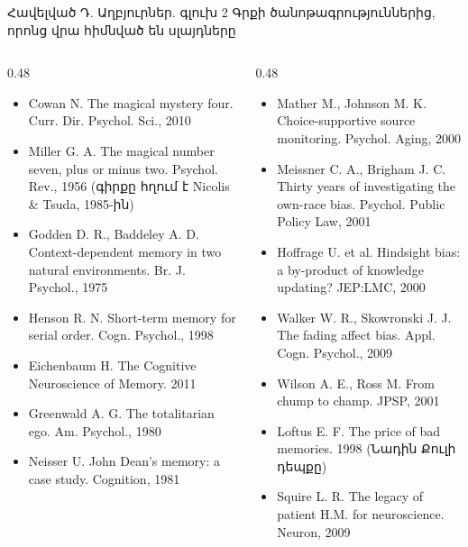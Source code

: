 \begin{frame}{Հավելված Դ. Աղբյուրներ. գլուխ 2}
  \scriptsize
  Գրքի ծանոթագրություններից, որոնց վրա հիմնված են սլայդները\par\smallskip
  \begin{columns}[T]
    \begin{column}{0.48\textwidth}
      \begin{itemize}\setlength{\itemsep}{0.4mm}
        \item Cowan N. The magical mystery four. Curr. Dir. Psychol. Sci., 2010
        \item Miller G. A. The magical number seven, plus or minus two. Psychol. Rev., 1956 (գիրքը հղում է Nicolis \& Tsuda, 1985-ին)
        \item Godden D. R., Baddeley A. D. Context-dependent memory in two natural environments. Br. J. Psychol., 1975
        \item Henson R. N. Short-term memory for serial order. Cogn. Psychol., 1998
        \item Eichenbaum H. The Cognitive Neuroscience of Memory. 2011
        \item Greenwald A. G. The totalitarian ego. Am. Psychol., 1980
        \item Neisser U. John Dean's memory: a case study. Cognition, 1981
      \end{itemize}
    \end{column}
    \begin{column}{0.48\textwidth}
      \begin{itemize}\setlength{\itemsep}{0.4mm}
        \item Mather M., Johnson M. K. Choice-supportive source monitoring. Psychol. Aging, 2000
        \item Meissner C. A., Brigham J. C. Thirty years of investigating the own-race bias. Psychol. Public Policy Law, 2001
        \item Hoffrage U. et al. Hindsight bias: a by-product of knowledge updating? JEP:LMC, 2000
        \item Walker W. R., Skowronski J. J. The fading affect bias. Appl. Cogn. Psychol., 2009
        \item Wilson A. E., Ross M. From chump to champ. JPSP, 2001
        \item Loftus E. F. The price of bad memories. 1998 (Նադին Քուլի դեպքը)
        \item Squire L. R. The legacy of patient H.M. for neuroscience. Neuron, 2009
      \end{itemize}
    \end{column}
  \end{columns}
\end{frame}
